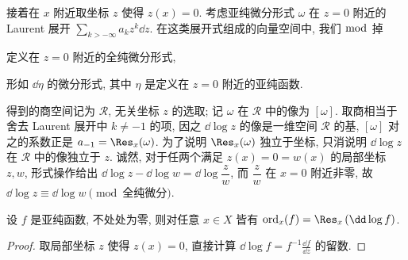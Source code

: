 接着在 $x$ 附近取坐标 $z$ 使得 $z(x)=0$. 考虑亚纯微分形式 $\omega$ 在 $z=0$ 附近的 Laurent 展开 $\sum_{k > -\infty} a_k z^k \dd z$. 在这类展开式组成的向量空间中, 我们 $\bmod$ 掉
\begin{compactenum}[(a)]
	\item 定义在 $z = 0$ 附近的全纯微分形式,
	\item 形如 $\dd\eta$ 的微分形式, 其中 $\eta$ 是定义在 $z = 0$ 附近的亚纯函数.
\end{compactenum}
得到的商空间记为 $\mathcal{R}$, 无关坐标 $z$ 的选取; 记 $\omega$ 在 $\mathcal{R}$ 中的像为 $[\omega]$. 取商相当于舍去 Laurent 展开中 $k \neq -1$ 的项, 因之 $\dd\log z$ 的像是一维空间 $\mathcal{R}$ 的基, $[\omega]$ 对之的系数正是 $a_{-1} = \Res_x(\omega)$. 为了说明 $\Res_x(\omega)$ 独立于坐标, 只消说明 $\dd\log z$ 在 $\mathcal{R}$ 中的像独立于 $z$. 诚然, 对于任两个满足 $z(x) = 0 = w(x)$ 的局部坐标 $z, w$, 形式操作给出 $\dd\log z - \dd\log w = \dd\log \dfrac{z}{w}$, 而 $\dfrac{z}{w}$ 在 $x = 0$ 附近非零, 故 $\dd \log z \equiv \dd \log w \pmod{\text{全纯微分}}$.

\begin{lemma}\label{prop:res-ord}
	设 $f$ 是亚纯函数, 不处处为零, 则对任意 $x \in X$ 皆有 $\mathrm{ord}_x(f) = \Res_x\left( \dd\log f \right)$.
\end{lemma}
\begin{proof}
	取局部坐标 $z$ 使得 $z(x)=0$, 直接计算 $\dd \log f = f^{-1} \frac{\dd f}{\dd z}$ 的留数.
\end{proof}

